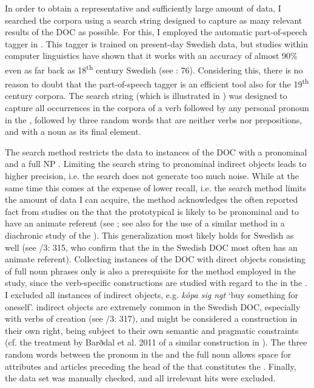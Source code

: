 \documentclass[output=paper]{langscibook}
\begin{document}
In order to obtain a representative and sufficiently large amount of data, I searched the corpora using a search string designed to capture as many relevant results of the DOC as possible. For this, I employed the automatic part-of-speech tagger in . This tagger is trained on present-day Swedish data, but studies within computer linguistics have shown that it works with an accuracy of almost 90\% even as far back as 18\textsuperscript{th} century Swedish (see \citealt{AdesamEtAl2016}: 76). Considering this, there is no reason to doubt that the part-of-speech tagger is an efficient tool also for the 19\textsuperscript{th} century corpora. The search string (which is illustrated in ) was designed to capture all occurrences in the corpora of a verb followed by any personal pronoun in the , followed by three random words that are neither verbs nor prepositions, and with a noun as its final element.



The search method restricts the data to instances of the DOC with a pronominal  and a full NP . Limiting the search string to pronominal indirect objects leads to higher precision, i.e. the search does not generate too much noise. While at the same time this comes at the expense of lower recall, i.e. the search method limits the amount of data I can acquire, the method acknowledges the often reported fact from studies on the   that the prototypical  is likely to be pronominal and to have an animate referent (see \citealt{BresnanEtAl2007}; see also \citealt{CollemanDe_Clerck2011} for the use of a similar method in a diachronic study of the  ). This generalization most likely holds for Swedish as well (see \citealt{TelemanEtAl1999}/3: 315, who confirm that the  in the Swedish DOC most often has an animate referent). Collecting instances of the DOC with direct objects consisting of full noun phrases only is also a prerequisite for the method employed in the study, since the verb-specific constructions are studied with regard to the  in the . I excluded all instances of  indirect objects, e.g. \textit{köpa sig ngt} ‘buy something for oneself’.  indirect objects are extremely common in the Swedish DOC, especially with verbs of creation (see \citealt{TelemanEtAl1999}/3: 317), and might be considered a construction in their own right, being subject to their own semantic and pragmatic constraints (cf. the treatment by Barðdal et al. 2011 of a similar construction in ). The three random words between the pronoun in the  and the full noun allows space for attributes and articles preceding the head of the  that constitutes the . Finally, the data set was manually checked, and all irrelevant hits were excluded.
\end{document}
